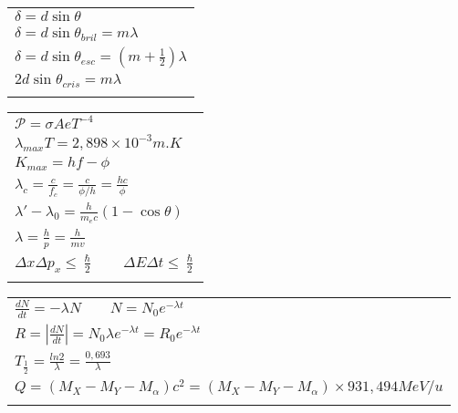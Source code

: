 \documentclass[a4paper]{article}
\begin{document}
\begin{tabular}{|l|}
\hline
$ \delta = d \sin \theta $ \\
$ \delta = d \sin \theta_{bril} = m\lambda $\\
$ \delta = d \sin \theta_{esc} = (m+\frac{1}{2})\lambda $\\
$ 2 d \sin \theta_{cris} = m \lambda $\\
\\
\hline
\end{tabular}
\newpage
\begin{tabular}{|l|}
\hline
$ \mathscr{P} = \sigma A e T^{-4} $ \\
$ \lambda_{max} T = 2,898 \times 10^{-3} m.K $ \\
$ K_{max} = hf - \phi $ \\
$ \lambda_c = \frac{c}{f_c} = \frac{c}{\phi / h} = \frac{hc}{\phi} $ \\
$ \lambda ' - \lambda_0 = \frac{h}{m_e c}(1 -  \cos \theta ) $ \\
$ \lambda = \frac{h}{p} = \frac {h}{mv} $ \\
$ \Delta x \Delta p_x \leq \frac{\hslash}{2} \qquad \Delta E \Delta t \leq \frac{\hslash}{2} $\\
\\
\hline
\end{tabular}
\begin{tabular}{|l|}
\hline

$ \frac{dN}{dt} = - \lambda N \qquad N = N_0 e^{-\lambda t} $ \\
$ R = \left| \frac{dN}{dt} \right| = N_0 \lambda e^{-\lambda t} = R_0 e^{-\lambda t} $ \\
$ T_{\frac{1}{2}} = \frac{ln 2}{\lambda} = \frac{0,693}{\lambda} $ \\
$ Q = ( M_X - M_Y - M_\alpha ) c^2 = ( M_X - M_Y - M_\alpha ) \times 931,494 MeV/u $\\
\\
\hline
\end{tabular}
\end{document}
